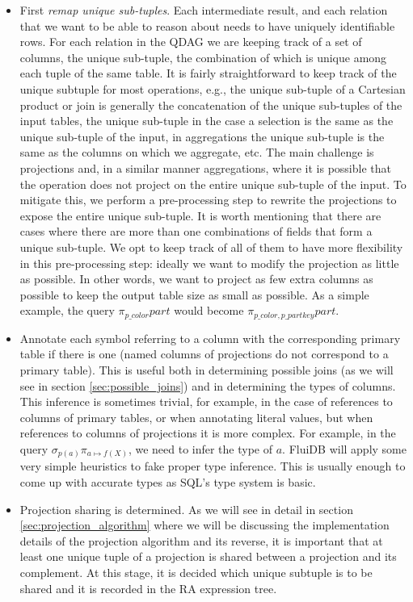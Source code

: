 \begin{itemize}
\item First \emph{remap unique sub-tuples}. Each intermediate result,
  and each relation that we want to be able to reason about needs to
  have uniquely identifiable rows. For each relation in the QDAG we
  are keeping track of a set of columns, the unique sub-tuple, the
  combination of which is unique among each tuple of the same
  table. It is fairly straightforward to keep track of the unique
  subtuple for most operations, e.g., the unique sub-tuple of a
  Cartesian product or join is generally the concatenation of the
  unique sub-tuples of the input tables, the unique sub-tuple in the
  case a selection is the same as the unique sub-tuple of the input,
  in aggregations the unique sub-tuple is the same as the columns on
  which we aggregate, etc. The main challenge is projections and, in a
  similar manner aggregations, where it is possible that the operation
  does not project on the entire unique sub-tuple of the input. To
  mitigate this, we perform a pre-processing step to rewrite the
  projections to expose the entire unique sub-tuple. It is worth
  mentioning that there are cases where there are more than one
  combinations of fields that form a unique sub-tuple. We opt to keep
  track of all of them to have more flexibility in this
  pre-processing step: ideally we want to modify the projection as
  little as possible. In other words, we want to project as few extra
  columns as possible to keep the output table size as small as
  possible. As a simple example, the query
  \(\pi_{p\_color}\mathit{part}\) would become
  \(\pi_{p\_color,p\_partkey} \mathit{part}\).

\item Annotate each symbol referring to a column with the
corresponding primary table if there is one (named columns of
projections do not correspond to a primary table). This is useful both
in determining possible joins (as we will see in section
\ref{sec:possible_joins}) and in determining the types of
columns. This inference is sometimes trivial, for example, in the case
of references to columns of primary tables, or when annotating literal
values, but when references to columns of projections it is more
complex.  For example, in the query \(\sigma_{p(a)} \pi_{a \mapsto
f(X)}\), we need to infer the type of \(a\).  FluiDB will apply some
very simple heuristics to fake proper type inference. This is usually
enough to come up with accurate types as SQL's type system is basic.

\item Projection sharing is determined. As we will see in detail in
section \ref{sec:projection_algorithm} where we will be discussing the
implementation details of the projection algorithm and its reverse, it
is important that at least one unique tuple of a projection is shared
between a projection and its complement. At this stage, it is decided
which unique subtuple is to be shared and it is recorded in the RA
expression tree.
\end{itemize}

